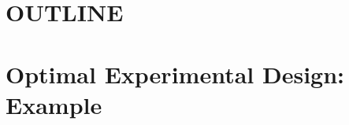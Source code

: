 \documentclass[preprint,review,12pt]{elsarticle}
\begin{document}
% 
% 


% 

\section{OUTLINE}





\section{Optimal Experimental Design: Example}
\label{S:2}
\end{document}
